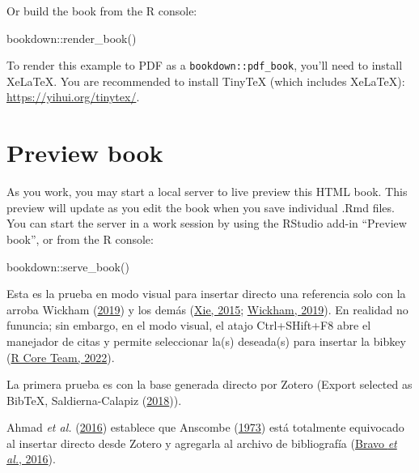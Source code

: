\documentclass[
  12pt,
]{book}
\newenvironment{Shaded}{\begin{snugshade}}{\end{snugshade}}
\newcommand{\FunctionTok}[1]{\textcolor[rgb]{0.00,0.00,0.00}{#1}}
\newcommand{\NormalTok}[1]{#1}
\newcommand{\SpecialCharTok}[1]{\textcolor[rgb]{0.00,0.00,0.00}{#1}}
\theoremstyle{definition}
\theoremstyle{definition}
\theoremstyle{definition}
\theoremstyle{definition}
\theoremstyle{remark}
\begin{document}
Or build the book from the R console:

\begin{Shaded}
\begin{Highlighting}[]
\NormalTok{bookdown}\SpecialCharTok{::}\FunctionTok{render\_book}\NormalTok{()}
\end{Highlighting}
\end{Shaded}

To render this example to PDF  as a \texttt{bookdown::pdf\_book}, you'll need to install XeLaTeX. You are recommended to install TinyTeX (which includes XeLaTeX): \url{https://yihui.org/tinytex/}.

\hypertarget{preview-book}{%
\section{\texorpdfstring{Preview book }{Preview book }}\label{preview-book}}

As you work, you may start a local server to live preview this HTML book. This preview will update as you edit the book when you save individual .Rmd files. You can start the server in a work session by using the RStudio add-in ``Preview book'', or from the R console:

\begin{Shaded}
\begin{Highlighting}[]
\NormalTok{bookdown}\SpecialCharTok{::}\FunctionTok{serve\_book}\NormalTok{()}
\end{Highlighting}
\end{Shaded}

Esta es la prueba en modo visual para insertar directo una referencia solo con la arroba Wickham (\protect\hyperlink{ref-wickham2019Advanced}{2019}) y los demás (\protect\hyperlink{ref-xie2015}{Xie, 2015}; \protect\hyperlink{ref-wickham2019Advanced}{Wickham, 2019}). En realidad no fununcia; sin embargo, en el modo visual, el atajo Ctrl+SHift+F8 abre el manejador de citas y permite seleccionar la(s) deseada(s) para insertar la bibkey (\protect\hyperlink{ref-R-base}{R Core Team, 2022}).

La primera prueba es con la base generada directo por Zotero (Export selected as BibTeX, Saldierna-Calapiz (\protect\hyperlink{ref-saldierna-calapiz2018Efectored}{2018})).

Ahmad \emph{et al.} (\protect\hyperlink{ref-ahmad2016UsingFisher}{2016}) establece que Anscombe (\protect\hyperlink{ref-anscombe1973GraphsStatistical}{1973}) está totalmente equivocado al insertar directo desde Zotero y agregarla al archivo de bibliografía (\protect\hyperlink{ref-bravo2016Teachinghigher}{Bravo \emph{et al.}, 2016}).
\end{document}
